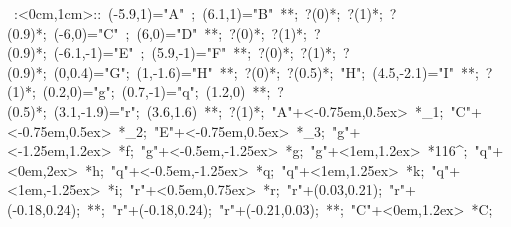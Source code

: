 
\hbox{
\xy    <1cm,0cm>:<0cm,1cm>::
       (-5.9,1)="A" ; (6.1,1)="B" **\dir{-}; 
		?(0)*\dir{<}; ?(1)*\dir{>}; ?(0.9)*\dir{>>};
       (-6,0)="C" ; (6,0)="D" **\dir{-}; 
		?(0)*\dir{<}; ?(1)*\dir{>}; ?(0.9)*\dir{>>};
       (-6.1,-1)="E" ; (5.9,-1)="F" **\dir{-};
		?(0)*\dir{<}; ?(1)*\dir{>}; ?(0.9)*\dir{>>};
       (0,0.4)="G"; (1,-1.6)="H" **\dir{-}; ?(0)*\dir{<}; ?(0.5)*\dir{||};
       "H"; (4.5,-2.1)="I" **\dir{-}; ?(1)*\dir{>};
       (0.2,0)="g"; (0.7,-1)="q"; (1.2,0) **\dir{-}; ?(0.5)*\dir{||};
       (3.1,-1.9)="r"; (3.6,1.6) **\dir{-}; ?(1)*\dir{>};
       "A"+<-0.75em,0.5ex> *{\ell_1};
       "C"+<-0.75em,0.5ex> *{\ell_2};
       "E"+<-0.75em,0.5ex> *{\ell_3};
       "g"+<-1.25em,1.2ex> *{f};
       "g"+<-0.5em,-1.25ex> *{g};
       "g"+<1em,1.2ex> *{116^\circ};
       "q"+<0em,2ex> *{h};
       "q"+<-0.5em,-1.25ex> *{q};
       "q"+<1em,1.25ex> *{k};
       "q"+<1em,-1.25ex> *{i};
       "r"+<0.5em,0.75ex> *{r};
       "r"+(0.03,0.21); "r"+(-0.18,0.24); **\dir{-};
       "r"+(-0.18,0.24); "r"+(-0.21,0.03); **\dir{-};
       "C"+<0em,1.2ex> *{C};
       \endxy}
	   

